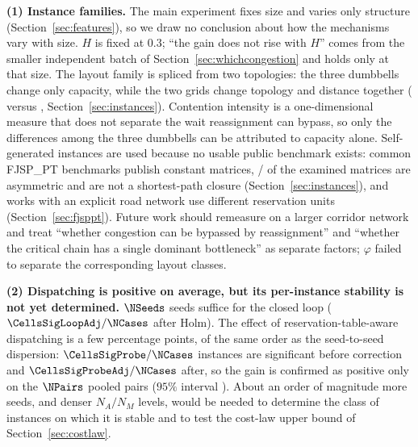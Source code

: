 \textbf{(1) Instance families.}
The main experiment fixes size and varies only structure (Section~\ref{sec:features}), so we draw no conclusion about how the mechanisms vary with size.
$H$ is fixed at $0.3$; ``the gain does not rise with $H$'' comes from the smaller independent batch of Section~\ref{sec:whichcongestion} and holds only at that size.
The layout family is spliced from two topologies: the three dumbbells change only capacity, while the two grids change topology and distance together (\LegDumbbell{} versus \LegGrid{}, Section~\ref{sec:instances}).
Contention intensity is a one-dimensional measure that does not separate the wait reassignment can bypass, so only the differences among the three dumbbells can be attributed to capacity alone.
Self-generated instances are used because no usable public benchmark exists: common FJSP\_PT benchmarks publish constant matrices, \PubNLayoutAsym{}/\PubNLayout{} of the examined matrices are asymmetric and \PubNLayoutBad{} are not a shortest-path closure (Section~\ref{sec:instances}), and works with an explicit road network use different reservation units (Section~\ref{sec:fjsppt}).
Future work should remeasure on a larger corridor network and treat ``whether congestion can be bypassed by reassignment'' and ``whether the critical chain has a single dominant bottleneck'' as separate factors; $\varphi$ failed to separate the corresponding layout classes.

\textbf{(2) Dispatching is positive on average, but its per-instance stability is not yet determined.}
$\NSeeds$ seeds suffice for the closed loop ($\CellsSigLoopAdj/\NCases$ after Holm).
The effect of reservation-table-aware dispatching is a few percentage points, of the same order as the seed-to-seed dispersion: $\CellsSigProbe/\NCases$ instances are significant before correction and $\CellsSigProbeAdj/\NCases$ after, so the gain is confirmed as positive only on the $\NPairs$ pooled pairs ($95\%$ interval \CIProbeLoop{}).
About an order of magnitude more seeds, and denser $N_A/N_M$ levels, would be needed to determine the class of instances on which it is stable and to test the cost-law upper bound of Section~\ref{sec:costlaw}.

